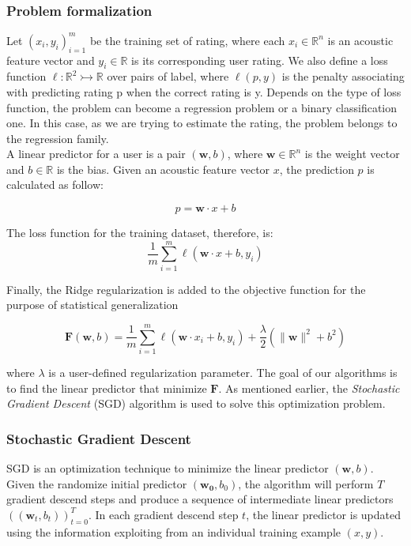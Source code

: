 \subsubsection{Problem formalization}
Let \({(x_i, y_i)}_{i=1}^{m}\) be the training set of rating, where each \(x_i \in \mathbb{R}^n\) is an acoustic feature vector and \(y_i \in \mathbb{R} \) is its corresponding user rating. We also define a loss function \( \ell : \mathbb{R}^2 \rightarrowtail \mathbb{R}\) over pairs of label, where \( \ell(p,y) \) is the penalty associating with predicting rating p when the correct rating is y. Depends on the type of loss function, the problem can become a regression problem or a binary classification one. In this case, as we are trying to estimate the rating, the problem belongs to the regression family. \\

\noindent A linear predictor for a user is a pair \(( \mathbf{w}, b)\), where \( \mathbf{w} \in \mathbb{R}^n \) is the weight vector and \(b \in \mathbb{R} \) is the bias. Given an acoustic feature vector \( x \), the prediction \(p\) is calculated as follow:

\begin{displaymath}
p = \mathbf{w} \cdot x + b
\end{displaymath} 

\noindent The loss function for the training dataset, therefore, is:
\begin{displaymath}
\frac{1}{m} \sum_{i=1}^{m} \ell (\mathbf{w} \cdot x + b, y_i)
\end{displaymath}

\noindent Finally, the Ridge regularization is added to the objective function for the purpose of statistical generalization \cite{du2013neural}

\begin{displaymath}
\mathbf{F} (\mathbf{w}, b) = \frac{1}{m} \sum_{i=1}^{m} \ell (\mathbf{w} \cdot x_i + b, y_i) + \frac{\lambda}{2} (\lVert \mathbf{w} \rVert^2 + b^2) \tag{2} \label{eq:2}
\end{displaymath}

\noindent where \(\lambda\) is a user-defined regularization parameter. The goal of our algorithms is to find the linear predictor that minimize \(\mathbf{F}\). As mentioned earlier, the \textit{Stochastic Gradient Descent} (SGD) algorithm is used to solve this optimization problem.

\subsubsection{Stochastic Gradient Descent}
SGD is an optimization technique to minimize the linear predictor \( (\mathbf{w}, b) \). Given the randomize initial predictor \( (\mathbf{w_0}, b_0) \), the algorithm will perform \(T\) gradient descend steps and produce a sequence of intermediate linear predictors \( ((\mathbf{w}_t, b_t))_{t=0}^{T} \). In each gradient descend step \(t\), the linear predictor is updated using the information exploiting from an individual training example \( (x, y)\). 

